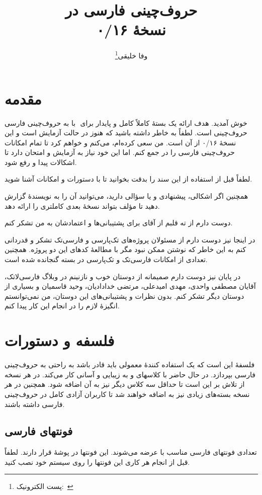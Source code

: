 \documentclass{report}
\title{حروف‌چینی فارسی در \eng{\XePersian}\\[0.2cm]نسخهٔ ۰/۱۶}
\author{وفا خلیقی\thanks{پست الکترونیک:~\eng{vafa.khalighi@students.mq.edu.au}}}
\begin{document}
\maths
\begin{farsi}
\maketitle
\tableofcontents
\chapter{مقدمه}
به حروف‌چینی فارسی ‪ ‬با ‪\eng{\XePersian} ‬خوش آمدید. هدف \eng{\XePersian} ارائه یک بستهٔ کاملاً کامل و پایدار برای حروف‌چینی است. لطفاً به خاطر داشته باشید که \eng{\XePersian} هنوز در حالت آزمایش است و این نسخهٔ ۰/۱۶ از آن است. من سعی کرده‌ام، می‌کنم و خواهم کرد تا تمام امکانات حروف‌چینی فارسی را در \eng{\XePersian} جمع کنم. اما این خود نیاز به آزمایش و امتحان دارد تا اشکالات پیدا و رفع شود.

لطفاً قبل از استفاده از \eng{\XePersian} این سند را بدقت بخوانید تا با دستورات و امکانات \eng{\XePersian} آشنا شوید.

همچنین اگر اشکالی، پیشنهادی و یا سؤالی دارید، می‌توانید آن را به نویسندهٔ \eng{\XePersian} گزارش دهید تا مؤلف \eng{\XePersian} بتواند نسخهٔ بعدی کاملتری را ارائه دهد.

دوست دارم از ته قلبم از آقای  برای پشتیبانی‌ها و اعتمادشان به من تشکر کنم.

در اینجا نیز دوست دارم از مسئولان پروژه‌های تک‌پارسی و فارسی‌تک تشکر و قدردانی کنم به این خاطر که نوشتن \eng{\XePersian} ممکن نبود مگر با مطالعهٔ کدهای این دو پروژه. همچنین تعدادی از امکانات فارسی‌تک و  تک‌پارسی در بسته گنجانده شده است.

در پایان نیز دوست دارم صمیمانه از دوستان خوب و نازنینم در وبلاگ فارسی‌لاتک، آقایان مصطفی واحدی، مهدی امیدعلی، مرتضی خدادادیان، وحید قاسمیان و بسیاری از دوستان دیگر تشکر کنم. بدون نظرات و پشتیبانی‌های این دوستان، من نمی‌توانستم انگیزهٔ لازم را در انجام این کار پیدا کنم.
\chapter{فلسفه و دستورات \eng{\XePersian}}
فلسفهٔ \eng{\XePersian} این است که یک استفاده کنندهٔ معمولی باید قادر باشد به راحتی به حروف‌چینی فارسی بپردازد. در حال حاضر \eng{\XePersian} با کلاسهای  و  به زیبایی و آسانی کار می‌کند. در هر نسخه از \eng{\XePersian} تلاش بر این است تا حداقل سه کلاس دیگر نیز به آن اضافه شود. همچنین در هر نسخه بسته‌های زیادی نیز به \eng{\XePersian} اضافه خواهند شد تا کاربران آزادی کامل در حروف‌چینی فارسی داشته باشند.
\section{فونتهای فارسی}
تعدادی فونتهای فارسی مناسب با \eng{\XePersian} عرضه می‌شوند. این فونتها در پوشهٔ  قرار دارند. لطفاً قبل از انجام هر کاری این فونتها را روی سیستم خود نصب کنید.

\end{farsi}
\end{document}

